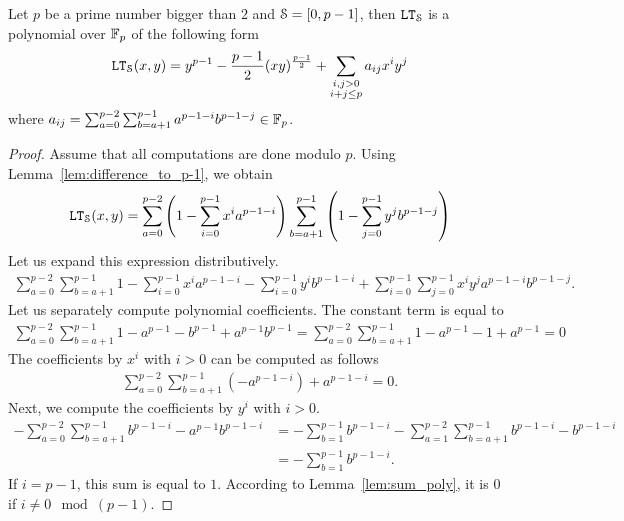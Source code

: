   \begin{theorem} \label{lem:less_than_total_degree}
    Let $p$ be a prime number bigger than $2$ and $\S = [0,p-1]$, then $\LT_\S$ is a polynomial over $\F_p$ of the following form
    \begin{align*}
      \LT_\S(x,y) = y^{p-1} - \frac{p-1}{2} (xy)^{\frac{p-1}{2}} + \sum_{\substack{i,j>0 \\ i+j \le p}} a_{ij} x^i y^j 
    \end{align*}
    where $a_{ij} = \sum_{a=0}^{p-2} \sum_{b=a+1}^{p-1} a^{p-1-i} b^{p-1-j} \in \F_p$.
  \end{theorem}
  \begin{proof}
    Assume that all computations are done modulo $p$.
    Using Lemma~\ref{lem:difference_to_p-1}, we obtain
    \begin{align*}
      \LT_\S(x,y) &=  \sum_{a = 0}^{p-2} \left(1-\sum_{i=0}^{p-1} x^i a^{p-1-i}\right) \sum_{b=a+1}^{p-1} \left(1-\sum_{j=0}^{p-1} y^j b^{p-1-j}\right)\\
    \end{align*}
    Let us expand this expression distributively.
    \begin{align*}
      \sum_{a = 0}^{p-2} \sum_{b=a+1}^{p-1} 1 - \sum_{i=0}^{p-1} x^i a^{p-1-i} - \sum_{i=0}^{p-1} y^i b^{p-1-i} + \sum_{i=0}^{p-1} \sum_{j=0}^{p-1} x^i y^j a^{p-1-i} b^{p-1-j}.
    \end{align*}
    Let us separately compute polynomial coefficients.
    The constant term is equal to
    \begin{align*}
      \sum_{a = 0}^{p-2} \sum_{b=a+1}^{p-1} 1 - a^{p-1} - b^{p-1} + a^{p-1} b^{p-1} = \sum_{a = 0}^{p-2} \sum_{b=a+1}^{p-1} 1 - a^{p-1} - 1 + a^{p-1} = 0 
    \end{align*}
    The coefficients by $x^i$ with $i > 0$ can be computed as follows
    \begin{align*}
      \sum_{a = 0}^{p-2} \sum_{b=a+1}^{p-1} \left(-a^{p-1-i}\right) + a^{p-1-i} = 0.
    \end{align*}
    Next, we compute the coefficients by $y^i$ with $i > 0$.
    \begin{align*}
      -\sum_{a = 0}^{p-2} \sum_{b=a+1}^{p-1} b^{p-1-i} - a^{p-1} b^{p-1-i} &= -\sum_{b=1}^{p-1} b^{p-1-i} - \sum_{a = 1}^{p-2} \sum_{b=a+1}^{p-1} b^{p-1-i} - b^{p-1-i} \\
      &= -\sum_{b=1}^{p-1} b^{p-1-i}.
    \end{align*}
    If $i = p-1$, this sum is equal to $1$.
    According to Lemma~\ref{lem:sum_poly}, it is $0$ if $i \ne 0 \mod (p-1)$.
    

\end{proof}
